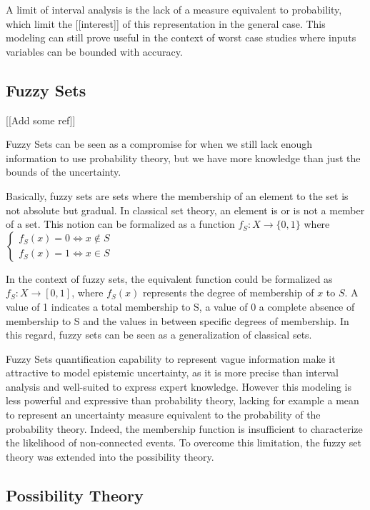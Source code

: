 A limit of interval analysis is the lack of a measure equivalent to probability, which limit the [[interest]] of this representation in the general case. This modeling can still prove useful in the context of worst case studies where inputs variables can be bounded with accuracy.

\subsection{Fuzzy Sets}

[[Add some ref]]

Fuzzy Sets can be seen as a compromise for when we still lack enough information to use probability theory, but we have more knowledge than just the bounds of the uncertainty.

Basically, fuzzy sets are sets where the membership of an element to the set is not absolute but gradual.
In classical set theory, an element is or is not a member of a set. This notion can be formalized as a function $f_S: X \rightarrow \{0,1\}$ where 
$\left\{
 		 \begin{array}{rcr}
			f_S(x) = 0 \Leftrightarrow x \not\in S\\
			f_S(x) = 1 \Leftrightarrow x \in S
		\end{array}
	\right. $

In the context of fuzzy sets, the equivalent function could be formalized as $f_S: X \rightarrow [0, 1]$, where $f_S(x)$ represents the degree of membership of $x$ to $S$. A value of 1 indicates a total membership to S, a value of 0 a complete absence of membership to S and the values in between specific degrees of membership.
In this regard, fuzzy sets can be seen as a generalization of classical sets.

Fuzzy Sets quantification capability to represent vague information make it attractive to model epistemic uncertainty, as it is more precise than interval analysis and well-suited to express expert knowledge. However this modeling is less powerful and expressive than probability theory, lacking for example a mean to represent an uncertainty measure equivalent to the probability of the probability theory. Indeed, the membership function is insufficient to characterize the likelihood of non-connected events.
To overcome this limitation, the fuzzy set theory was extended into the possibility theory.

\subsection{Possibility Theory}

